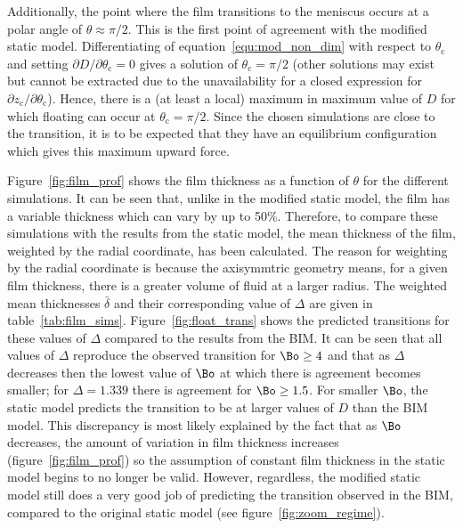 {Additionally, the point where the film transitions to the meniscus occurs at a polar angle of $\theta \approx \pi / 2$. This is the first point of agreement with the modified static model. Differentiating of equation~\ref{equ:mod_non_dim} with respect to $\theta_{\text{c}}$ and setting $\partial D / \partial \theta_{\text{c}} = 0$ gives a solution of $\theta_{\text{c}} = \pi / 2$ (other solutions may exist but cannot be extracted due to the unavailability for a closed expression for $\partial z_{\text{c}} / \partial \theta_{\text{c}}$). Hence, there is a (at least a local) maximum in maximum value of $D$ for which floating can occur at $\theta_{\text{c}} = \pi / 2$. Since the chosen simulations are close to the transition, it is to be expected that they have an equilibrium configuration which gives this maximum upward force.

Figure~\ref{fig:film_prof} shows the film thickness as a function of $\theta$ for the different simulations. It can be seen that, unlike in the modified static model, the film has a variable thickness which can vary by up to 50\%. Therefore, to compare these simulations with the results from the static model, the mean thickness of the film, weighted by the radial coordinate, has been calculated. The reason for weighting by the radial coordinate is because the axisymmtric geometry means, for a given film thickness, there is a greater volume of fluid at a larger radius. The weighted mean thicknesses $\bar{\delta}$ and their corresponding value of $\Delta$ are given in table~\ref{tab:film_sims}. Figure~\ref{fig:float_trans} shows the predicted transitions for these values of $\Delta$ compared to the results from the BIM. It can be seen that all values of $\Delta$ reproduce the observed transition for $\Bo \geq 4$ and that as $\Delta$ decreases then the lowest value of $\Bo$ at which there is agreement becomes smaller; for $\Delta = 1.339$ there is agreement for $\Bo \geq 1.5$. For smaller $\Bo$, the static model predicts the transition to be at larger values of $D$ than the BIM model. This discrepancy is most likely explained by the fact that as $\Bo$ decreases, the amount of variation in film thickness increases (figure~\ref{fig:film_prof}) so the assumption of constant film thickness in the static model begins to no longer be valid. However, regardless, the modified static model still does a very good job of predicting the transition observed in the BIM, compared to the original static model (see figure~\ref{fig:zoom_regime}).

    \begin{figure}
      \centering
      \begin{subfigure}[b]{0.45\textwidth}
        \resizebox{\textwidth}{!}{\Large }
        \caption{}
        \label{fig:float1}
      \end{subfigure}
      ~
      \begin{subfigure}[b]{0.45\textwidth}
        \resizebox{\textwidth}{!}{\Large }
        \caption{}
        \label{fig:float2}
      \end{subfigure}
      

\end{figure}}
